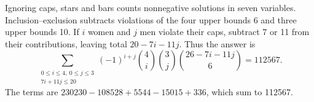 Ignoring caps, stars and bars counts nonnegative solutions in seven variables. Inclusion--exclusion subtracts violations of the four upper bounds 6 and three upper bounds 10. If $i$ women and $j$ men violate their caps, subtract 7 or 11 from their contributions, leaving total $20-7i-11j$. Thus the answer is\[\sum_{\substack{0\le i\le4,\ 0\le j\le3\\7i+11j\le20}}(-1)^{i+j}\binom4i\binom3j\binom{26-7i-11j}{6}=\boxed{112567}.\]The terms are $230230-108528+5544-15015+336$, which sum to 112567.
